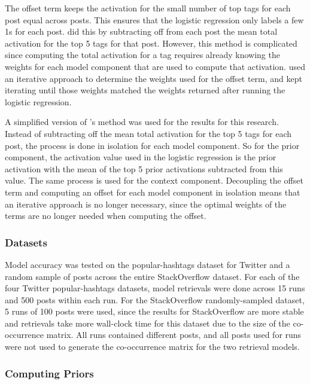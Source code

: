 \documentclass[man,floatsintext,donotrepeattitle]{apa6}
\begin{document}
The offset term keeps the activation for the small number of top tags for each post equal across posts.
This ensures that the logistic regression only labels a few 1s for each post.
\textcite{Stanley2013} did this by subtracting off from each post the mean total activation for the top 5 tags for that post.
However, this method is complicated since computing the total activation for a tag requires already knowing the weights for each model component that are used to compute that activation.
\citeauthor{Stanley2013} used an iterative approach to determine the weights used for the offset term, and kept iterating until those weights matched the weights returned after running the logistic regression.

A simplified version of \citeauthor{Stanley2013}'s method was used for the results for this research.
Instead of subtracting off the mean total activation for the top 5 tags for each post, the process is done in isolation for each model component.
So for the prior component, the activation value used in the logistic regression is the prior activation with the mean of the top 5 prior activations subtracted from this value.
The same process is used for the context component.
Decoupling the offset term and computing an offset for each model component in isolation means that an iterative approach is no longer necessary,
since the optimal weights of the terms are no longer needed when computing the offset.

\subsubsection{Datasets}

Model accuracy was tested on the popular-hashtags dataset for Twitter and a random sample of posts across the entire StackOverflow dataset.
For each of the four Twitter popular-hashtags datasets, model retrievals were done across 15 runs and 500 posts within each run.
For the StackOverflow randomly-sampled dataset, 5 runs of 100 posts were used,
since the results for StackOverflow are more stable and retrievals take more wall-clock time for this dataset due to the size of the co-occurrence matrix.
All runs contained different posts, and all posts used for runs were not used to generate the co-occurrence matrix for the two retrieval models.

\subsubsection{Computing Priors}
\end{document}
